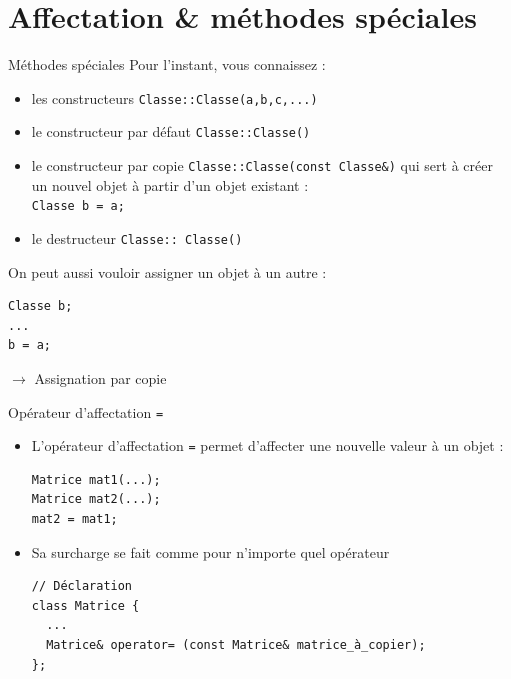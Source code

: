 \documentclass[c]{beamer}
\newcommand{\inline}[1]{\texttt{#1}}
\begin{document}

\part{Affectation \& méthodes spéciales}
\frame{\partpage}


\begin{frame}[fragile]{Méthodes spéciales}
Pour l'instant, vous connaissez :
\begin{itemize}
  \item les constructeurs \inline{Classe::Classe(a,b,c,...)}
  \item le constructeur par défaut \inline{Classe::Classe()}
  \item le constructeur par copie \inline{Classe::Classe(const Classe&)} qui sert à créer un nouvel objet à partir d'un objet existant :\\ \inline{Classe b = a;}
  \item le destructeur \inline{Classe::~Classe()}
\end{itemize}
\pause
\vspace{1em}
On peut aussi vouloir assigner un objet à un autre :
\begin{verbatim}
Classe b;
...
b = a;
\end{verbatim}
$\rightarrow$ Assignation par copie
\end{frame}


\begin{frame}[fragile]{Opérateur d'affectation \texttt{=}}
 \begin{itemize}
\item L'opérateur d'affectation \texttt{=} permet d'affecter une nouvelle valeur à un objet  :

\begin{verbatim}
Matrice mat1(...);
Matrice mat2(...);
mat2 = mat1;
\end{verbatim}

\vspace{1em}
\item Sa surcharge se fait comme pour n'importe quel opérateur

\begin{verbatim}
// Déclaration
class Matrice {
  ...
  Matrice& operator= (const Matrice& matrice_à_copier);
};
\end{verbatim}
\end{itemize}
\end{frame}
\end{document}
